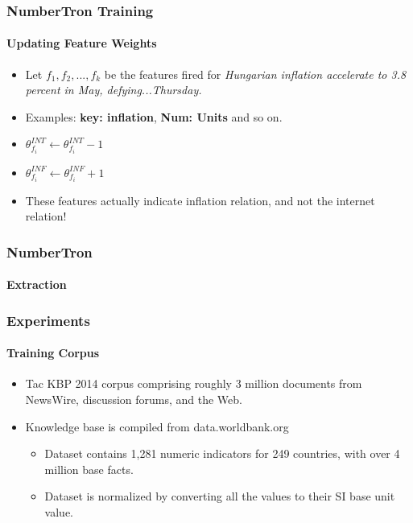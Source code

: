 \documentclass{beamer}
\begin{document}
\begin{frame}
\frametitle{NumberTron Training}
\framesubtitle{Updating Feature Weights}
\begin{itemize}
\setlength{\itemsep}{1em}
\item Let $f_1, f_2, ..., f_k$ be the features fired for \textit{Hungarian inflation  accelerate to 3.8 percent in May, defying...Thursday.}
\item Examples: \textbf{key: inflation}, \textbf{Num: Units} and so on.
\item $\theta_{f_i}^{INT} \gets \theta_{f_i}^{INT} - 1$
\item $\theta_{f_i}^{INF} \gets \theta_{f_i}^{INF} + 1$
\item These features actually indicate inflation relation, and not the internet relation!
\end{itemize}
\end{frame}


\begin{frame}
\frametitle{NumberTron}
\framesubtitle{Extraction}
\end{frame}

\begin{frame}
\frametitle{Experiments}
\framesubtitle{Training Corpus}

\begin{itemize}
\item Tac KBP 2014 corpus comprising roughly 3 million documents from NewsWire, discussion forums, and the Web.
\item Knowledge base is compiled from data.worldbank.org
\begin{itemize}
\item Dataset contains 1,281 numeric indicators for 249 countries, with over 4 million base facts.
\item Dataset is normalized by converting all the values to their SI base unit value.
\end{itemize}
\end{itemize}

\end{frame}

\end{document}

